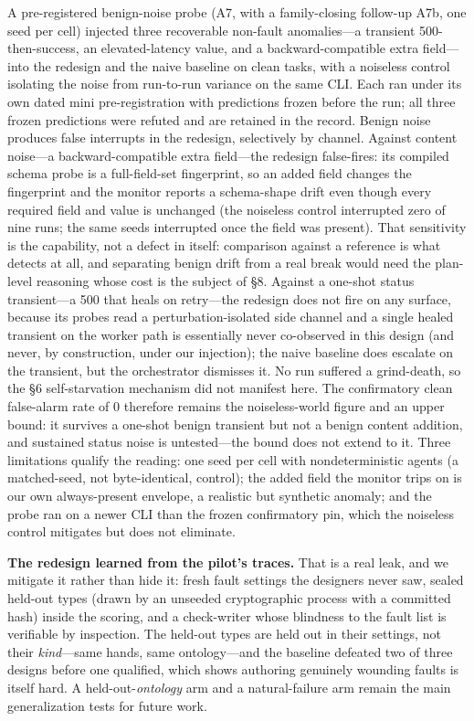 \documentclass[acmsmall,screen]{acmart}
\begin{document}
A pre-registered benign-noise probe (A7, with a family-closing follow-up A7b, one
seed per cell) injected three recoverable non-fault anomalies---a transient
500-then-success, an elevated-latency value, and a backward-compatible extra
field---into the redesign and the naive baseline on clean tasks, with a noiseless
control isolating the noise from run-to-run variance on the same CLI. Each ran
under its own dated mini pre-registration with predictions frozen before the run;
all three frozen predictions were refuted and are retained in the record. Benign
noise produces false interrupts in the redesign, selectively by channel. Against
content noise---a backward-compatible extra field---the redesign false-fires: its
compiled schema probe is a full-field-set fingerprint, so an added field changes
the fingerprint and the monitor reports a schema-shape drift even though every
required field and value is unchanged (the noiseless control interrupted zero of
nine runs; the same seeds interrupted once the field was present). That
sensitivity is the capability, not a defect in itself: comparison against a
reference is what detects at all, and separating benign drift from a real break
would need the plan-level reasoning whose cost is the subject of \S8. Against a
one-shot status transient---a 500 that heals on retry---the redesign does not fire
on any surface, because its probes read a perturbation-isolated side channel and a
single healed transient on the worker path is essentially never co-observed in
this design (and never, by construction, under our injection); the naive baseline
does escalate on the transient, but the orchestrator dismisses it. No run suffered
a grind-death, so the \S6 self-starvation mechanism did not manifest here. The
confirmatory clean false-alarm rate of 0 therefore remains the noiseless-world
figure and an upper bound: it survives a one-shot benign transient but not a
benign content addition, and sustained status noise is untested---the bound does
not extend to it. Three limitations qualify the reading: one seed per cell with
nondeterministic agents (a matched-seed, not byte-identical, control); the added
field the monitor trips on is our own always-present envelope, a realistic but
synthetic anomaly; and the probe ran on a newer CLI than the frozen confirmatory
pin, which the noiseless control mitigates but does not eliminate.

\textbf{The redesign learned from the pilot's traces.} That is a real leak, and
we mitigate it rather than hide it: fresh fault settings the designers never
saw, sealed held-out types (drawn by an unseeded cryptographic process with a
committed hash) inside the scoring, and a check-writer whose blindness to the
fault list is verifiable by inspection. The held-out types are held out in their
settings, not their \emph{kind}---same hands, same ontology---and the baseline
defeated two of three designs before one qualified, which shows authoring
genuinely wounding faults is itself hard. A held-out-\emph{ontology} arm and a
natural-failure arm remain the main generalization tests for future work.
\end{document}

